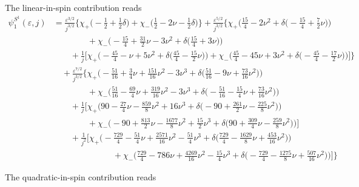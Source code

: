 \documentclass[prd,superscriptaddress,preprintnumbers,tightenlines,nofootinbib, eqsecnum]{revtex4-2}
\newcommand{\nn}{\nonumber}
\begin{document}
The linear-in-spin contribution reads
\begin{align}
\psi_1^{S^1}(\varepsilon,j) &= \frac{\varepsilon^{3/2}}{j^{3/2}}\Bigg\{
\chi_{+}\Bigg(-\frac{1}{2} + \frac{1}{2}\delta\Bigg) + \chi_{-}\Bigg(\frac{1}{2} - 2 \nu - \frac{1}{2}\delta\Bigg)\Bigg\}   + \frac{\varepsilon^{5/2}}{j^{3/2}}\Bigg\{
\chi_{+}\Bigg(\frac{15}{4} - 2 \nu^{2} + \delta\bigg(-\frac{15}{4} + \frac{7}{2}\nu\bigg)\Bigg) \nn \\
&\qquad\qquad + \chi_{-}\Bigg(-\frac{15}{4} + \frac{31}{2}\nu - 3 \nu^{2} + \delta\bigg(\frac{15}{4} + 3 \nu\bigg)\Bigg) \nn \\
&\qquad + \frac{1}{j}\Bigg[\chi_{+}\Bigg(-\frac{45}{4} - \nu + 5 \nu^{2} + \delta\bigg(\frac{45}{4} - \frac{15}{2}\nu\bigg)\Bigg) + \chi_{-}\Bigg(\frac{45}{4} - 45 \nu + 3 \nu^{2} + \delta\bigg(-\frac{45}{4} - \frac{17}{2}\nu\bigg)\Bigg)\Bigg]\Bigg\} \nn \\
&\quad + \frac{\varepsilon^{7/2}}{j^{3/2}}\Bigg\{
\chi_{+}\Bigg(-\frac{51}{16} + \frac{3}{4}\nu + \frac{151}{16}\nu^{2} - 3 \nu^{3} + \delta\bigg(\frac{51}{16} - 9 \nu + \frac{73}{16}\nu^{2}\bigg)\Bigg) \nn \\
&\qquad\qquad + \chi_{-}\Bigg(\frac{51}{16} - \frac{69}{4}\nu + \frac{319}{16}\nu^{2} - 3 \nu^{3} + \delta\bigg(-\frac{51}{16} - \frac{15}{4}\nu + \frac{73}{16}\nu^{2}\bigg)\Bigg) \nn \\
&\qquad + \frac{1}{j}\Bigg[\chi_{+}\Bigg(90 - \frac{27}{4}\nu - \frac{859}{8}\nu^{2} + 16 \nu^{3} + \delta\bigg(-90 + \frac{261}{2}\nu - \frac{225}{8}\nu^{2}\bigg)\Bigg) \nn \\
&\qquad\qquad + \chi_{-}\Bigg(-90 + \frac{813}{2}\nu - \frac{1677}{8}\nu^{2} + \frac{15}{2}\nu^{3} + \delta\bigg(90 + \frac{309}{4}\nu - \frac{259}{8}\nu^{2}\bigg)\Bigg)\Bigg] \nn \\
&\qquad + \frac{1}{j^{2}}\Bigg[\chi_{+}\Bigg(-\frac{729}{4} - \frac{51}{4}\nu + \frac{2571}{16}\nu^{2} - \frac{51}{4}\nu^{3} + \delta\bigg(\frac{729}{4} - \frac{1629}{8}\nu + \frac{453}{16}\nu^{2}\bigg)\Bigg) \nn \\
&\qquad\qquad\qquad\quad + \chi_{-}\Bigg(\frac{729}{4} - 786 \nu + \frac{4269}{16}\nu^{2} - \frac{15}{4}\nu^{3} + \delta\bigg(-\frac{729}{4} - \frac{1275}{8}\nu + \frac{507}{16}\nu^{2}\bigg)\Bigg)\Bigg]\Bigg\} 
\end{align}

The quadratic-in-spin contribution reads
\end{document}
